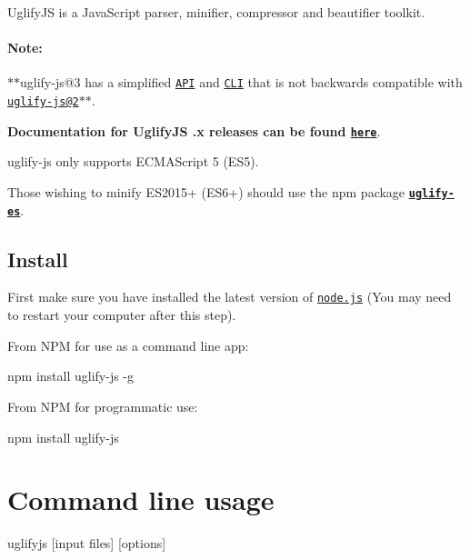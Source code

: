 Uglify\+JS is a Java\+Script parser, minifier, compressor and beautifier toolkit.

\paragraph*{Note\+:}


\begin{DoxyItemize}
\item $\ast$$\ast${\ttfamily uglify-\/js@3} has a simplified \href{#api-reference}{\tt A\+PI} and \href{#command-line-usage}{\tt C\+LI} that is not backwards compatible with \href{https://github.com/mishoo/UglifyJS2/tree/v2.x}{\tt {\ttfamily uglify-\/js@2}}$\ast$$\ast$.
\item {\bfseries Documentation for Uglify\+JS {.\+x} releases can be found \href{https://github.com/mishoo/UglifyJS2/tree/v2.x}{\tt here}}.
\item {\ttfamily uglify-\/js} only supports E\+C\+M\+A\+Script 5 (E\+S5).
\item Those wishing to minify E\+S2015+ (E\+S6+) should use the {\ttfamily npm} package \href{https://github.com/mishoo/UglifyJS2/tree/harmony}{\tt {\bfseries uglify-\/es}}.
\end{DoxyItemize}

\subsection*{Install }

First make sure you have installed the latest version of \href{http://nodejs.org/}{\tt node.\+js} (You may need to restart your computer after this step).

From N\+PM for use as a command line app\+: \begin{DoxyVerb}npm install uglify-js -g
\end{DoxyVerb}


From N\+PM for programmatic use\+: \begin{DoxyVerb}npm install uglify-js
\end{DoxyVerb}


\section*{Command line usage}

\begin{DoxyVerb}uglifyjs [input files] [options]
\end{DoxyVerb}


